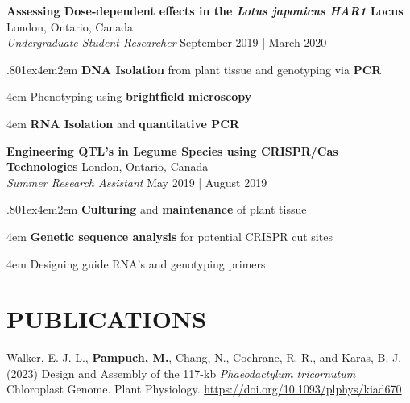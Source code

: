 \documentclass[a4paper,9pt]{extarticle}
\begin{document}
\noindent
\begin{minipage}{1\textwidth}
\setlength{\parindent}{15pt} %
	\noindent
	\textbf{Assessing Dose-dependent effects in the \textit{Lotus japonicus HAR1} Locus} \hfill London, Ontario, Canada\\ %
	\textit{Undergraduate Student Researcher}
	\hfill September 2019 | March 2020  \par %
	{\hsize.80\linewidth\parskip1ex\hangindent4em\parindent2em 
	\setlength{\parskip}{0pt} %
		\textbf{DNA Isolation} from plant tissue and genotyping via \textbf{PCR}\par
		\hangindent4em
		Phenotyping using \textbf{brightfield microscopy}\par
		\hangindent4em
		\textbf{RNA Isolation} and \textbf{quantitative PCR}\par}
\end{minipage}
\vspace{\parskip}

\noindent
\begin{minipage}{1\textwidth}
\setlength{\parindent}{15pt} %
	\noindent
	\textbf{Engineering QTL's in Legume Species using CRISPR/Cas Technologies} \hfill London, Ontario, Canada\\ %
	\textit{Summer Research Assistant}
	\hfill May 2019 | August 2019 \par %
	{\hsize.80\linewidth\parskip1ex\hangindent4em\parindent2em 
	\setlength{\parskip}{0pt} %
		\textbf{Culturing} and \textbf{maintenance} of plant tissue \par
		\hangindent4em
		\textbf{Genetic sequence analysis} for potential CRISPR cut sites \par
		\hangindent4em
		Designing guide RNA's and genotyping primers \par}
\end{minipage}

\section*{PUBLICATIONS}
\noindent
\begin{minipage}{1\textwidth}
\setlength{\parindent}{15pt} %
	\noindent
	Walker, E. J. L., \textbf{Pampuch, M.}, Chang, N., Cochrane, R. R., and Karas, B. J. (2023) Design and Assembly of the 117-kb \textit{Phaeodactylum tricornutum} Chloroplast Genome. Plant Physiology. \href{https://doi.org/10.1093/plphys/kiad670}{https://doi.org/10.1093/plphys/kiad670} \\
\end{minipage}
\end{document}
